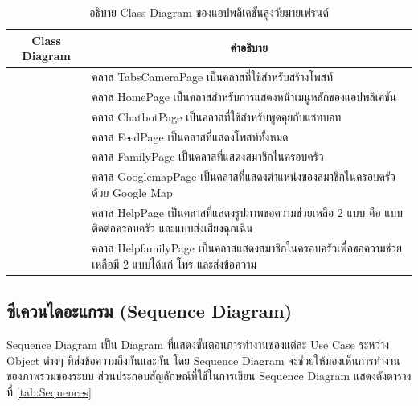 \begin{table}[H]
	\centering
	\caption{อธิบาย Class Diagram ของแอปพลิเคชันสูงวัยมายเฟรนด์}
	\label{tab:class}
	\begin{tabular}{|c|p{10cm}|}
		\hline
		\textbf{Class Diagram} & \multicolumn{1}{c|}{\textbf{คำอธิบาย}} \\ \hline
		\raisebox{-\totalheight}{TabsCameraPage}
		& \setstretch{1.5} {คลาส TabsCameraPage เป็นคลาสที่ใช้สำหรับสร้างโพสท์} \\ \hline
		\raisebox{-\totalheight}{HomePage}
		& \setstretch{1.5} {คลาส HomePage เป็นคลาสสำหรับการแสดงหน้าเมนูหลักของแอปพลิเคชัน} \\ \hline
		\raisebox{-\totalheight}{ChatbotPage}
		& \setstretch{1.5} {คลาส ChatbotPage เป็นคลาสที่ใช้สำหรับพูดคุยกับแชทบอท} \\ \hline
		\raisebox{-\totalheight}{FeedPage}
		& \setstretch{1.5} {คลาส FeedPage เป็นคลาสที่แสดงโพสท์ทั้งหมด} \\ \hline
		\raisebox{-\totalheight}{FamilyPage}
		& \setstretch{1.5} {คลาส FamilyPage เป็นคลาสที่แสดงสมาชิกในครอบครัว} \\ \hline
		\raisebox{-\totalheight}{GooglemapPage}
		& \setstretch{1.5} {คลาส GooglemapPage เป็นคลาสที่แสดงตำแหน่งของสมาชิกในครอบครัวด้วย Google Map} \\ \hline
		\raisebox{-\totalheight}{HelpPage}
		& \setstretch{1.5} {คลาส HelpPage เป็นคลาสที่แสดงรูปภาพขอความช่วยเหลือ 2 แบบ คือ แบบติดต่อครอบครัว และแบบส่งเสียงฉุกเฉิน} \\ \hline
		\raisebox{-\totalheight}{HelpfamilyPage}
		& \setstretch{1.5} {คลาส HelpfamilyPage เป็นคลาสแสดงสมาชิกในครอบครัวเพื่อขอความช่วยเหลือมี 2 แบบได้แก่ โทร และส่งข้อความ} \\ \hline
\end{tabular}
\end{table}

\newpage



\subsection{ซีเควนไดอะแกรม (Sequence Diagram)}
	Sequence Diagram เป็น Diagram ที่แสดงขั้นตอนการทำงานของแต่ละ Use Case ระหว่าง Object ต่างๆ ที่ส่งข้อความถึงกันและกัน โดย Sequence Diagram จะช่วยให้มองเห็นการทำงานของภาพรวมของระบบ ส่วนประกอบสัญลักษณ์ที่ใช้ในการเขียน Sequence Diagram 
	แสดงดังตารางที่ \ref{tab:Sequences}
	
